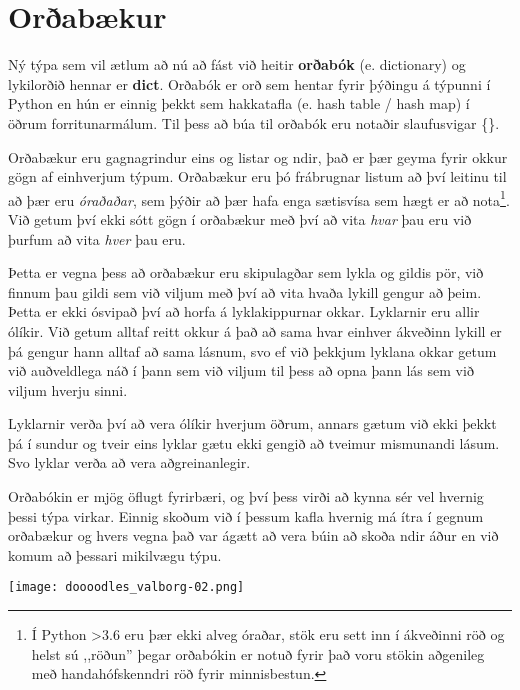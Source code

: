 
\chapter{Orðabækur}\label{k:orðabækur}
Ný týpa sem vil ætlum að nú að fást við heitir \textbf{orðabók} (e. dictionary)  og lykilorðið hennar er \textbf{dict}.
Orðabók er orð sem hentar fyrir þýðingu á týpunni í Python en hún er einnig þekkt sem hakkatafla (e. hash table / hash map) í öðrum forritunarmálum.
Til þess að búa til orðabók eru notaðir slaufusvigar \{\}.

Orðabækur eru gagnagrindur eins og listar og ndir, það er þær geyma fyrir okkur gögn af einhverjum týpum.
Orðabækur eru þó frábrugnar listum að því leitinu til að þær eru \textit{óraðaðar}, sem þýðir að þær hafa enga sætisvísa sem hægt er að nota\footnote{Í Python >3.6 eru þær ekki alveg óraðar, stök eru sett inn í ákveðinni röð og helst sú ,,röðun'' þegar orðabókin er notuð fyrir það voru stökin aðgenileg með handahófskenndri röð fyrir minnisbestun.}.
Við getum því ekki sótt gögn í orðabækur með því að vita \textit{hvar} þau eru við þurfum að vita \textit{hver} þau eru.

Þetta er vegna þess að orðabækur eru skipulagðar sem lykla og gildis pör, við finnum þau gildi sem við viljum með því að vita hvaða lykill gengur að þeim.
Þetta er ekki ósvipað því að horfa á lyklakippurnar okkar.
Lyklarnir eru allir ólíkir.
Við getum alltaf reitt okkur á það að sama hvar einhver ákveðinn lykill er þá gengur hann alltaf að sama lásnum, svo ef við þekkjum lyklana okkar getum við auðveldlega náð í þann sem við viljum til þess að opna þann lás sem við viljum hverju sinni.

Lyklarnir verða því að vera ólíkir hverjum öðrum, annars gætum við ekki þekkt þá í sundur og tveir eins lyklar gætu ekki gengið að tveimur mismunandi lásum.
Svo lyklar verða að vera aðgreinanlegir.

Orðabókin er mjög öflugt fyrirbæri, og því þess virði að kynna sér vel hvernig þessi týpa virkar.
Einnig skoðum við í þessum kafla hvernig má ítra í gegnum orðabækur og hvers vegna það var ágætt að vera búin að skoða ndir áður en við komum að þessari mikilvægu týpu.

	\begin{center}
		\texttt{[image: doooodles\_valborg-02.png]}
	\end{center}
